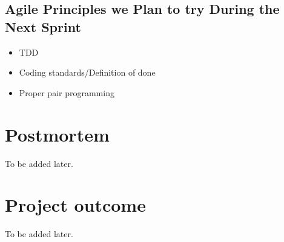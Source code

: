 \documentclass[14]{article}
\begin{document}
\subsection{Agile Principles we Plan to try During the Next Sprint}
\begin{itemize}
    \item TDD
    \item Coding standards/Definition of done
    \item Proper pair programming 
\end{itemize}


\section{Postmortem}
To be added later.

\section{Project outcome}
To be added later.
\end{document}
